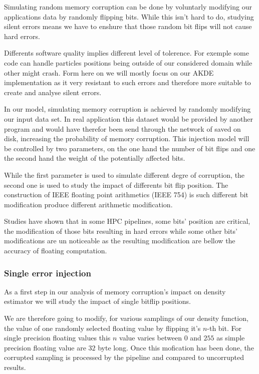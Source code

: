 \documentclass[10pt,a4paper,twoside,twocolumn]{article}
\begin{document}
Simulating random memory corruption can be done by voluntarly modifying our
applications data by randomly flipping bits. While this isn't hard to do,
studying silent errors means we have to enshure that those random bit flips will
not cause hard errors.

Differents software quality implies different level of tolerence. For exemple
some code can handle particles positions being outside of our considered domain
while other might crash. Form here on we will
mostly focus on our AKDE implementation as it very resistant to such errors and
therefore more suitable to create and analyse silent errors.

In our model, simulating memory corruption is achieved by randomly modifying our
input data set. In real application this dataset would be provided by another
program and would have therefor been send through the network of saved on disk,
increasing the probability of memory corruption. This injection model will be
controlled by two parameters, on the one hand the number of bit flips and one
the second hand the weight of the potentially affected bits.

While the first parameter is used to simulate different degre of corruption, the
second one is used to study the impact of differents bit flip position. The
construction of IEEE floating point arithmetics\cite{Kahan1996} (IEEE 754) is
such different bit modification produce different arithmetic modification.

Studies have shown that in some HPC pipelines, some bits' position are critical,
the modification of those bits resulting in hard errors while some other bits' 
modifications are un noticeable as the resulting modification are bellow the
accuracy of floating computation.

\subsubsection{Single error injection}

As a first step in our analysis of memory corruption's impact on density
estimator we will study the impact of single bitflip positions.

We are therefore going to modify, for various samplings of our density function,
the value of one randomly selected floating value by flipping it's $n$-th bit.
For single precision floating values this $n$ value varies between $0$ and $255$
as simple precision floating value are $32$ byte long. Once this mofication has
been done, the corrupted sampling is processed by the pipeline and compared to
uncorrupted results.
\end{document}
